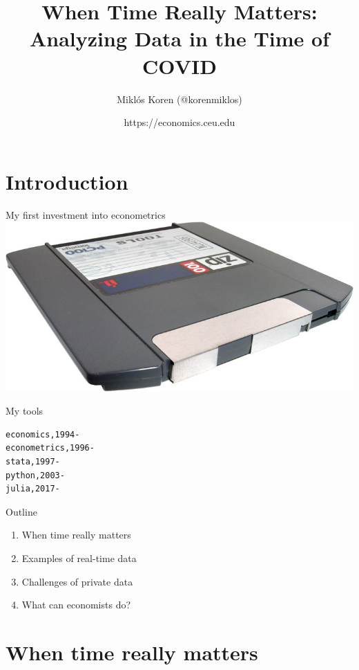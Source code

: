 \documentclass[
  ignorenonframetext,
  aspectratio=1610,
]{beamer}
\title{When Time Really Matters: Analyzing Data in the Time of COVID}
\author{Miklós Koren (@korenmiklos)}
\date{https://economics.ceu.edu}
\providecommand{\tightlist}{%
  \setlength{\itemsep}{0pt}\setlength{\parskip}{0pt}}
\begin{document}
\frame{\titlepage}

\hypertarget{introduction}{%
\section{Introduction}\label{introduction}}

\begin{frame}{My first investment into econometrics}
\protect\hypertarget{my-first-investment-into-econometrics}{}
\includegraphics{exhibit/zipdrive.jpg}
\end{frame}

\begin{frame}[fragile]{My tools}
\protect\hypertarget{my-tools}{}
\begin{verbatim}
economics,1994-
econometrics,1996-
stata,1997-
python,2003-
julia,2017-
\end{verbatim}
\end{frame}

\begin{frame}{Outline}
\protect\hypertarget{outline}{}
\begin{enumerate}
\tightlist
\item
  When time really matters
\item
  Examples of real-time data
\item
  Challenges of private data
\item
  What can economists do?
\end{enumerate}
\end{frame}

\hypertarget{when-time-really-matters}{%
\section{When time really matters}\label{when-time-really-matters}}
\end{document}
